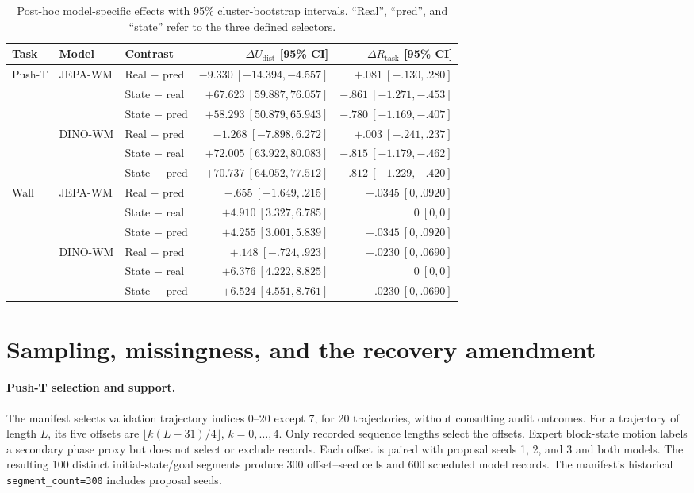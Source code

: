 \documentclass{article}
\begin{document}
\begin{table}[h]
\caption{Post-hoc model-specific effects with 95\% cluster-bootstrap
intervals. ``Real'', ``pred'', and ``state'' refer to the three defined selectors.}
\label{tab:models}
\centering\small
\begin{tabular}{lllrr}
\toprule
Task & Model & Contrast & $\Delta U_{\mathrm{dist}}$ [95\% CI] & $\Delta R_{\mathrm{task}}$ [95\% CI]\\
\midrule
Push-T & JEPA-WM & Real $-$ pred & $-9.330\ [-14.394,-4.557]$ & $+.081\ [-.130,.280]$\\
 & & State $-$ real & $+67.623\ [59.887,76.057]$ & $-.861\ [-1.271,-.453]$\\
 & & State $-$ pred & $+58.293\ [50.879,65.943]$ & $-.780\ [-1.169,-.407]$\\
 & DINO-WM & Real $-$ pred & $-1.268\ [-7.898,6.272]$ & $+.003\ [-.241,.237]$\\
 & & State $-$ real & $+72.005\ [63.922,80.083]$ & $-.815\ [-1.179,-.462]$\\
 & & State $-$ pred & $+70.737\ [64.052,77.512]$ & $-.812\ [-1.229,-.420]$\\
\addlinespace
Wall & JEPA-WM & Real $-$ pred & $-.655\ [-1.649,.215]$ & $+.0345\ [0,.0920]$\\
 & & State $-$ real & $+4.910\ [3.327,6.785]$ & $0\ [0,0]$\\
 & & State $-$ pred & $+4.255\ [3.001,5.839]$ & $+.0345\ [0,.0920]$\\
 & DINO-WM & Real $-$ pred & $+.148\ [-.724,.923]$ & $+.0230\ [0,.0690]$\\
 & & State $-$ real & $+6.376\ [4.222,8.825]$ & $0\ [0,0]$\\
 & & State $-$ pred & $+6.524\ [4.551,8.761]$ & $+.0230\ [0,.0690]$\\
\bottomrule
\end{tabular}
\end{table}

\section{Sampling, missingness, and the recovery amendment}
\label{app:protocol}

\paragraph{Push-T selection and support.}
The manifest selects validation trajectory indices 0--20 except 7, for 20
trajectories, without consulting audit outcomes. For a trajectory of length
$L$, its five offsets are $\lfloor k(L-31)/4\rfloor$, $k=0,\ldots,4$.
Only recorded sequence lengths select the offsets. Expert block-state motion
labels a secondary phase proxy but does not select or exclude records.
Each offset is paired with proposal seeds 1, 2, and 3 and both models.
The resulting 100 distinct initial-state/goal segments produce 300 offset--seed
cells and 600 scheduled model records. The manifest's historical
\texttt{segment\_count=300} includes proposal seeds.
\end{document}
